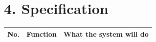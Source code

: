 \clearpage
\section{4. Specification}\label{specification}

{\def\LTcaptype{none} %
\begin{longtable}[]{|
  >{\centering\arraybackslash}m{}|
  >{\raggedright\arraybackslash}m{}|
  >{\raggedright\arraybackslash}m{}|}
\hline
\begin{minipage}[c]{\linewidth}\centering
\textbf{No.}
\end{minipage} & \begin{minipage}[c]{\linewidth}\centering
\textbf{Function}
\end{minipage} & \begin{minipage}[c]{\linewidth}\centering
\textbf{What the system will do}
\end{minipage} \\
\hline
\endhead


\end{longtable}}
